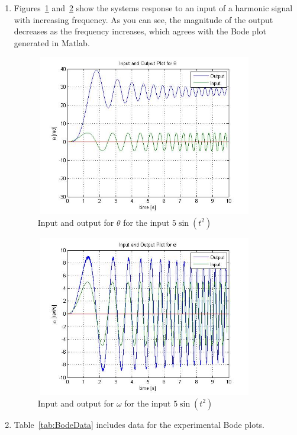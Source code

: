 \documentclass[letterpaper, 11pt, openany]{book}
\begin{document}
\begin{enumerate}
\item Figures~\ref{fig:Thetatsquared} and~\ref{fig:Omegatsquared} show the systems response 
to an input of a harmonic signal with increasing frequency. As you can see, the magnitude of 
the output decreases as the frequency increases, which agrees with the Bode plot generated 
in Matlab.
\begin{figure}[htbp]
\centering
\includegraphics[width=0.9\textwidth, height = 7cm]{graphics/Thetatsquared.jpg} 
\caption{Input and output for $\theta$ for the input $5\sin(t^2)$}\label{fig:Thetatsquared}
\end{figure}

\begin{figure}[htbp]
\centering
\includegraphics[width=0.9\textwidth, height = 7cm]{graphics/Omegatsquared.jpg} 
\caption{Input and output for $\omega$ for the input $5\sin(t^2)$}\label{fig:Omegatsquared}
\end{figure}

\item Table~\ref{tab:BodeData} includes data for the experimental Bode plots. 


\end{enumerate}
\end{document}
